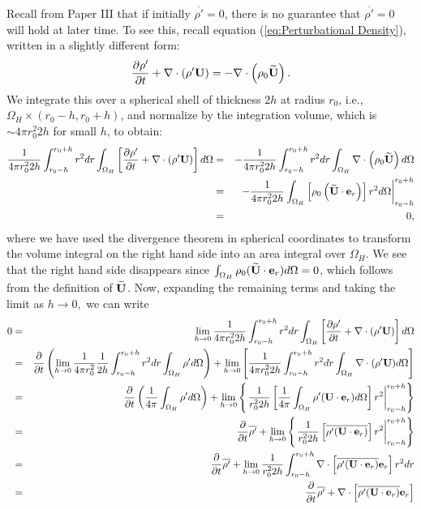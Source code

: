 Recall from Paper III that if initially $\overline{\rho'} = 0$,
there is no guarantee that $\overline{\rho'} = 0$ will hold at later
time.  To see this, recall equation (\ref{eq:Perturbational Density}),
written in a slightly different form:
\begin{equation}
\frac{\partial\rho'}{\partial t} + \nabla\cdot\left(\rho'{\bf U}\right) = -\nabla\cdot\left(\rho_0\widetilde{{\bf U}}\right).
\end{equation}
We integrate this over a spherical shell of thickness $2h$ at radius $r_0$, i.e.,
$\Omega_H \times (r_0-h, r_0+h)$, and normalize by the integration
volume, which is $\sim 4\pi r_0^2  2h$ for small $h$, to obtain:
\begin{eqnarray}
\frac{1}{4\pi r_0^2 2h}\int_{r_0-h}^{r_0+h}r^2 dr\int_{\Omega_H}\left[\frac{\partial\rho'}{\partial t} + \nabla\cdot\left(\rho'{\bf U}\right)\right]d\Omega 
&=& - \frac{1}{4\pi r_0^2 2h}\int_{r_0-h}^{r_0+h}r^2 dr\int_{\Omega_H}\nabla\cdot\left(\rho_0\widetilde{{\bf U}}\right)d\Omega \nonumber \\
&=& \left. -\frac{1}{4\pi r_0^2 2h}\int_{\Omega_H}\left[\rho_0\left(\widetilde{{\bf U}}\cdot{\bf e}_r\right)\right]r^2 d\Omega\right|_{r_0-h}^{r_0+h} \nonumber \\
&=& 0,
\end{eqnarray} 
where we have used the divergence theorem in spherical coordinates to transform
the volume integral on the right hand side into an area integral over $\Omega_H$.  
We see that the right hand side disappears since 
$\int_{\Omega_H}\rho_0(\widetilde{{\bf U}}\cdot{\bf e}_r)d\Omega=0$,  which follows from the definition 
of $\widetilde{{\bf U}}$.  Now, expanding the remaining terms and taking the limit as 
$h\rightarrow 0,$ we can write
\begin{eqnarray} 
0 &=& \lim_{h\rightarrow 0} \frac{1}{4\pi r_0^2 2h} \int_{r_0-h}^{r_0+h} r^2  dr \int_{\Omega_H} \left[\frac{\partial \rho'}{\partial t} + \nabla\cdot(\rho'{\bf U})\right] d\Omega \nonumber \\
&=& \frac{\partial}{\partial t} \left( \lim_{h\rightarrow 0} \frac{1}{4\pi r_0^2} \frac{1}{2h} \int_{r_0-h}^{r_0+h} r^2  dr \int_{\Omega_H}  \rho' d\Omega \right) + \lim_{h\rightarrow 0} \left[\frac{1}{4\pi r_0^2  2h} \int_{r_0-h}^{r_0+h} r^2  dr \int_{\Omega_H}  \nabla \cdot ( \rho' {\bf U} )  d\Omega\right] \nonumber \\
&=& \frac{\partial}{\partial t} \left(\frac{1}{4\pi} \int_{\Omega_H}  \rho'  d\Omega \right) + \lim_{h\rightarrow 0} \left\{\left.\frac{1}{r_0^2 2h}\left[\frac{1}{4\pi}\int_{\Omega_H} \rho' ({\bf U} \cdot {\bf e}_r)  d\Omega  \right]  r^2 \right |_{r_0-h}^{r_0+h} \right\} \nonumber  \\
&=&  \frac{\partial}{\partial t} \overline{\rho'} + \lim_{h\rightarrow 0} \left\{ \left .  \frac{1}{r_0^2  2h} \left[ \overline{\rho' ({\bf U} \cdot {\bf e}_r)} \right]  r^2  \right |_{r_0-h}^{r_0+h} \right\} \nonumber  \\
&=&  \frac{\partial}{\partial t} \overline{\rho'} + \lim_{h\rightarrow 0} \frac{1}{r_0^2 2h} \int_{r_0-h}^{r_0+h} \nabla \cdot \left[\overline{\rho' ({\bf U} \cdot {\bf e}_r)} {\bf e}_r \right]  r^2  dr \nonumber \\
&=&  \frac{\partial}{\partial t} \overline{\rho'} + \nabla \cdot \left[ \overline{\rho' ({\bf U} \cdot {\bf e}_r)} {\bf e}_r \right]
\end{eqnarray} 
